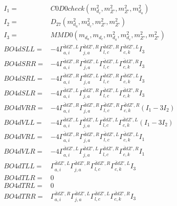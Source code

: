 \documentclass[A4,landscape]{article}
\begin{document}
\begin{align} 
I_1 = & C0D0check(m^2_{d_{{c}}}, m^2_{{Z'}}, m^2_{{Z'}}, m^2_{d_{{a}}}) \\ 
I_2 = & D_{27}(m^2_{d_{{a}}}, m^2_{d_{{c}}}, m^2_{{Z'}}, m^2_{{Z'}}) \\ 
I_3 = & MMD0(m_{d_{{a}}}, m_{d_{{c}}}, m^2_{d_{{a}}}, m^2_{d_{{c}}}, m^2_{{Z'}}, m^2_{{Z'}}) \\ 
  BO4dSLL= & -4  \Gamma^{\bar{d}d {Z'} ,L}_{a, i} \Gamma^{\bar{d}d {Z'} ,R}_{j, a} \Gamma^{\bar{d}d {Z'} ,R}_{l, c} \Gamma^{\bar{d}d {Z'} ,L}_{c, k} I_3 \\ 
  BO4dSRR= & -4  \Gamma^{\bar{d}d {Z'} ,R}_{a, i} \Gamma^{\bar{d}d {Z'} ,L}_{j, a} \Gamma^{\bar{d}d {Z'} ,L}_{l, c} \Gamma^{\bar{d}d {Z'} ,R}_{c, k} I_3 \\ 
  BO4dSRL= & -4  \Gamma^{\bar{d}d {Z'} ,R}_{a, i} \Gamma^{\bar{d}d {Z'} ,L}_{j, a} \Gamma^{\bar{d}d {Z'} ,R}_{l, c} \Gamma^{\bar{d}d {Z'} ,L}_{c, k} I_3 \\ 
  BO4dSLR= & -4  \Gamma^{\bar{d}d {Z'} ,L}_{a, i} \Gamma^{\bar{d}d {Z'} ,R}_{j, a} \Gamma^{\bar{d}d {Z'} ,L}_{l, c} \Gamma^{\bar{d}d {Z'} ,R}_{c, k} I_3 \\ 
  BO4dVRR= & -4  \Gamma^{\bar{d}d {Z'} ,R}_{a, i} \Gamma^{\bar{d}d {Z'} ,R}_{j, a} \Gamma^{\bar{d}d {Z'} ,R}_{l, c} \Gamma^{\bar{d}d {Z'} ,R}_{c, k} (I_1 - 3 I_2) \\ 
  BO4dVLL= & -4  \Gamma^{\bar{d}d {Z'} ,L}_{a, i} \Gamma^{\bar{d}d {Z'} ,L}_{j, a} \Gamma^{\bar{d}d {Z'} ,L}_{l, c} \Gamma^{\bar{d}d {Z'} ,L}_{c, k} (I_1 - 3 I_2) \\ 
  BO4dVRL= & -4  \Gamma^{\bar{d}d {Z'} ,R}_{a, i} \Gamma^{\bar{d}d {Z'} ,R}_{j, a} \Gamma^{\bar{d}d {Z'} ,L}_{l, c} \Gamma^{\bar{d}d {Z'} ,L}_{c, k} I_1 \\ 
  BO4dVLR= & -4  \Gamma^{\bar{d}d {Z'} ,L}_{a, i} \Gamma^{\bar{d}d {Z'} ,L}_{j, a} \Gamma^{\bar{d}d {Z'} ,R}_{l, c} \Gamma^{\bar{d}d {Z'} ,R}_{c, k} I_1 \\ 
  BO4dTLL= &  \Gamma^{\bar{d}d {Z'} ,L}_{a, i} \Gamma^{\bar{d}d {Z'} ,R}_{j, a} \Gamma^{\bar{d}d {Z'} ,R}_{l, c} \Gamma^{\bar{d}d {Z'} ,L}_{c, k} I_3 \\ 
  BO4dTLR= & 0 \\ 
  BO4dTRL= & 0 \\ 
  BO4dTRR= &  \Gamma^{\bar{d}d {Z'} ,R}_{a, i} \Gamma^{\bar{d}d {Z'} ,L}_{j, a} \Gamma^{\bar{d}d {Z'} ,L}_{l, c} \Gamma^{\bar{d}d {Z'} ,R}_{c, k} I_3 \\ 
\end{align} 
\end{document}
